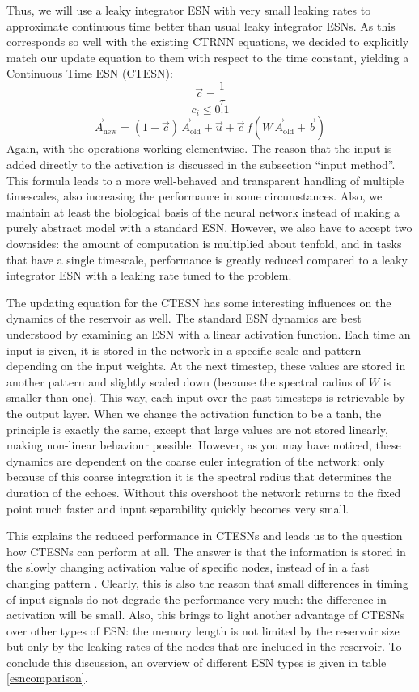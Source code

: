 \documentclass[10pt,a4paper]{report}
\begin{document}
Thus, we will use a leaky integrator ESN with very small leaking rates to approximate continuous time better than usual leaky integrator ESNs. As this corresponds so well with the existing CTRNN equations, we decided to explicitly match our update equation to them with respect to the time constant, yielding a Continuous Time ESN (CTESN): 
\[  \vec{c} = \frac{1}{\tau} \]
\[  c_i \leq 0.1 \]
\begin{equation}
 \vec{A}_{\text{new}} = (1 - \vec{c} ) \, \vec{A}_{\text{old}} + \vec{u} + \vec{c} \, f(W \, \vec{A}_{\text{old}} + \vec{b} ) 
 \label{ourupdate}
\end{equation}
Again, with the operations working elementwise. The reason that the input is added directly to the activation is discussed in the subsection ``input method''. This formula leads to a more well-behaved and transparent handling of multiple timescales, also increasing the performance in some circumstances. Also, we maintain at least the biological basis of the neural network instead of making a purely abstract model with a standard ESN. However, we also have to accept two downsides: the amount of computation is multiplied about tenfold, and in tasks that have a single timescale, performance is greatly reduced compared to a leaky integrator ESN with a leaking rate tuned to the problem.

The updating equation for the CTESN has some interesting influences on the dynamics of the reservoir as well. The standard ESN dynamics are best understood by examining an ESN with a linear activation function. Each time an input is given, it is stored in the network in a specific scale and pattern depending on the input weights. At the next timestep, these values are stored in another pattern and slightly scaled down (because the spectral radius of $W$ is smaller than one). This way, each input over the past timesteps is retrievable by the output layer. When we change the activation function to be a tanh, the principle is exactly the same, except that large values are not stored linearly, making non-linear behaviour possible. However, as you may have noticed, these dynamics are dependent on the coarse euler integration of the network: only because of this coarse integration it is the spectral radius that determines the duration of the echoes. Without this overshoot the network returns to the fixed point much faster and input separability quickly becomes very small. 

This explains the reduced performance in CTESNs and leads us to the question how CTESNs can perform at all. The answer is that the information is stored in the slowly changing activation value of specific nodes, instead of in a fast changing pattern \citep{Schrauwen2007}. Clearly, this is also the reason that small differences in timing of input signals do not degrade the performance very much: the difference in activation will be small. Also, this brings to light another advantage of CTESNs over other types of ESN: the memory length is not limited by the reservoir size but only by the leaking rates of the nodes that are included in the reservoir. To conclude this discussion, an overview of different ESN types is given in table \ref{esncomparison}.
\end{document}
